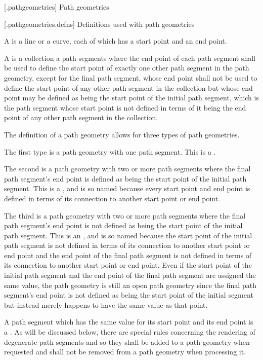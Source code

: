  [\iotwod.pathgeometries] {Path geometries}

 [\iotwod.pathgeometries.defns] {Definitions used with path geometries}

\pnum
A  is a line or a curve, each of which has a start point and an end point.

\pnum
A  is a collection a path segments where the end point of each path segment shall be used to define the start point of exactly one other path segment in the path geometry, except for the final path segment, whose end point shall not be used to define the start point of any other path segment in the collection but whose end point may be defined as being the start point of the initial path segment, which is the path segment whose start point is not defined in terms of it being the end point of any other path segment in the collection.

\pnum
The definition of a path geometry allows for three types of path geometries. 

\pnum
The first type is a path geometry with one path segment. This is a .

\pnum
The second is a path geometry with two or more path segments where the final path segment's end point is defined as being the start point of the initial path segment. This is a , and is so named because every start point and end point is defined in terms of its connection to another start point or end point.

\pnum
The third is a path geometry with two or more path segments where the final path segment's end point is not defined as being the start point of the initial path segment. This is an , and is so named because the start point of the initial path segment is not defined in terms of its connection to another start point or end point and the end point of the final path segment is not defined in terms of its connection to another start point or end point.
\enternote
Even if the start point of the initial path segment and the end point of the final path segment are assigned the same value, the path geometry is still an open path geometry since the final path segment's end point is not defined as being the start point of the initial segment but instead merely happens to have the same value as that point.
\exitnote

\pnum
A path segment which has the same value for its start point and its end point is a . As will be discussed below, there are special rules concerning the rendering of degenerate path segments and so they shall be added to a path geometry when requested and shall not be removed from a path geometry when processing it.

